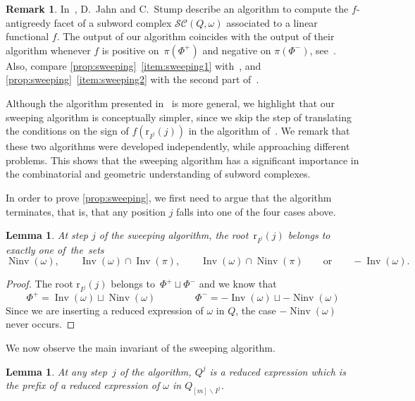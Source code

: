 \documentclass[reqno]{amsart}
\newtheorem{lemma}[theorem]{Lemma}
\theoremstyle{definition}
\newtheorem{remark}[theorem]{Remark}
\newcommand{\ssm}{\smallsetminus} %
\DeclareMathOperator{\Inv}{Inv} %
\DeclareMathOperator{\Ninv}{Ninv} %
\newcommand{\subwordComplex}{\mathcal{SC}} %
\newcommand{\rootFunction}[2]{\mathrm{r}_{#1}(#2)} %
\begin{document}
\begin{remark}
\label{rem:sweepJahnStump}
In~\cite[Sect.~3.3]{JahnStump}, D.~Jahn and C.~Stump describe an algorithm to compute the $f$-antigreedy facet of a subword complex $\subwordComplex(Q,\omega)$ associated to a linear functional $f$.  
The output of our algorithm coincides with the output of their algorithm whenever $f$ is positive on~$\pi(\Phi^+)$ and negative on $\pi(\Phi^-)$, see~\cite[Prop.~4.12]{JahnStump}.
Also, compare \cref{prop:sweeping}~\eqref{item:sweeping1} with~\cite[Thm.~3.17 (a)]{JahnStump}, and \cref{prop:sweeping}~\eqref{item:sweeping2} with the second part of~\cite[Prop.~4.12]{JahnStump}.

Although the algorithm presented in~\cite{JahnStump} is more general, we highlight that our sweeping algorithm is conceptually simpler, since we skip the step of translating the conditions on the sign of $f(\rootFunction{I^j}{j})$ in the algorithm of~\cite{JahnStump}.
We remark that these two algorithms were developed independently, while approaching different problems.
This shows that the sweeping algorithm has a significant importance in the combinatorial and geometric understanding of subword complexes.  
\end{remark}

In order to prove \cref{prop:sweeping}, we first need to argue that the algorithm terminates, that is, that any position $j$ falls into one of the four cases above.

\begin{lemma}
\label{lem:sweeping1}
At step $j$ of the sweeping algorithm, the root~$\rootFunction{I^j}{j}$ belongs to exactly one of~the~sets
\[
\Ninv(\omega),
\qquad
\Inv(\omega) \cap \Inv(\pi),
\qquad
\Inv(\omega) \cap \Ninv(\pi)
\qquad\text{or}\qquad
-\Inv(\omega).
\]
\end{lemma}

\begin{proof}
The root $\rootFunction{I^j}{j}$ belongs to~$\Phi^+ \sqcup \Phi^-$ and we know that
\[
\Phi^+ = \Inv(\omega) \sqcup \Ninv(\omega) \qquad \qquad
\Phi^- = -\Inv(\omega) \sqcup -\Ninv(\omega)  
\]
Since we are inserting a reduced expression of $\omega$ in $Q$, the case $-\Ninv(\omega)$ never occurs.
\end{proof}

We now observe the main invariant of the sweeping algorithm.

\begin{lemma}
\label{lem:sweeping2}
At any step~$j$ of the algorithm, $Q^j$ is a reduced expression which is the prefix of a reduced expression of $\omega$ in $Q_{[m]\ssm I^j}$.
\end{lemma}
\end{document}
